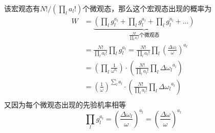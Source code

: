 该宏观态有\({N!} / (\prod_l a_l !)\)个微观态，那么这个宏观态出现的概率为
\begin{equation}
  \begin{aligned}
  W 
  &=\underbrace{\left(\prod_l g_l^{a_l}+\prod_l g_l^{a_l}+\prod_l g_l^{a_l}+\dots\right)}_{\frac{N!}{\prod_l a_l!} \text{个微观态}} \\
  &= \frac{N!}{\prod_l a_l!} \prod_l g_l^{a_l}=
\frac{N!}{\prod_l a_l!}
\prod_l \left(\frac{\Delta \omega_l}{\omega}\right)^{a_l}\\
    &=
\left(\prod_l \frac{1}{\omega^{a_l}}\right)
\cdot
\left(\frac{N!}{\prod_l a_l!}
\prod_l {\Delta \omega_l}^{a_l}
\right) \\
    &=
\left(\frac{1}{\omega}\right)^{\sum_l a_l}
\cdot
\left(\frac{N!}{\prod_l a_l!}
\prod_l {\Delta \omega_l}^{a_l}
\right) \\
  \end{aligned}
\end{equation}
又因为每个微观态出现的先验机率相等
\begin{equation}
\prod_l g_l^{a_l}=\left(\frac{\Delta \omega_l}{\omega}\right)^{a_l}
=\left(\frac{\Delta \omega}{\omega}\right)^{a_l}
\end{equation}




